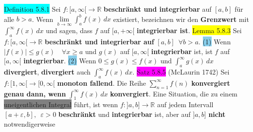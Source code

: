 \documentclass[landscape, 10pt]{article}
\newcommand{\R}{\mathbb{R}}
\begin{document}
\begin{multicols}{3}
\colorbox{cyan}{Definition 5.8.1} Sei 
                \textcolor{NavyBlue}{$f:[a,\infty[\longrightarrow\R$}
                \textbf{beschränkt und integrierbar} auf 
                \textcolor{NavyBlue}{$[a,b]$} für alle 
                \textcolor{NavyBlue}{$b>a$}. 
                Wenn \textcolor{NavyBlue}{$\lim\limits_{b\to\infty}\int_a^bf(x)\,dx$} 
         existiert, bezeichnen wir den \textbf{Grenzwert} mit 
                \textcolor{NavyBlue}{$\int_a^\infty f(x)\,dx$} 
                und sagen, dass \textcolor{NavyBlue}{$f$} auf 
                \textcolor{NavyBlue}{$[a,+\infty[$} \textbf{integrierbar ist}.
\colorbox{yellow}{Lemma 5.8.3} Sei \textcolor{NavyBlue}{$f:[a,\infty[\longrightarrow\R$} 
                \textbf{beschränkt und integrierbar auf} 
                \textcolor{NavyBlue}{$[a,b]\enspace\forall b>a$}. 
         \colorbox{SkyBlue}{(1)} Wenn 
                \textcolor{NavyBlue}{$|f(x)|\leqslant g(x)\quad\forall x\geqslant a$}
                und \textcolor{NavyBlue}{$g(x)$} auf \textcolor{NavyBlue}{$[a,\infty[$} 
                \textbf{integrierbar} ist, ist 
                \textcolor{NavyBlue}{$f$} auf \textcolor{NavyBlue}{$[a,\infty[$}
                \textbf{integrierbar}. 
         \colorbox{SkyBlue}{(2)} Wenn 
                \textcolor{NavyBlue}{$0\leqslant g(x)\leqslant f(x)$} 
                und \textcolor{NavyBlue}{$\int_a^\infty g(x)\,dx$} 
                \textbf{divergiert}, \textbf{divergiert} auch 
                \textcolor{NavyBlue}{$\int_a^\infty f(x)\,dx$}.
\colorbox{magenta}{Satz 5.8.5} (McLaurin 1742) Sei 
                \textcolor{NavyBlue}{$f:[1,\infty[\longrightarrow[0,\infty[$} 
                \textbf{monoton fallend}. Die Reihe 
                \textcolor{NavyBlue}{$\sum_{n=1}^\infty f(n)$} \textbf{konvergiert genau 
         dann, wenn} \textcolor{NavyBlue}{$\int_1^\infty f(x)\,dx$} 
                \textbf{konvergiert}. 
Eine Situation, die zu einem \colorbox{gray}{uneigentlichen Integral} führt, 
                ist wenn \textcolor{NavyBlue}{$f:]a,b]\longrightarrow\R$} 
                auf jedem Intervall 
         \textcolor{NavyBlue}{$[a+\varepsilon,b],\enspace\varepsilon>0$} 
                \textbf{beschränkt} und \textbf{integrierbar} ist, aber auf 
                \textcolor{NavyBlue}{$]a,b]$} \textbf{nicht} notwendigerweise 

\end{multicols}
\end{document}
